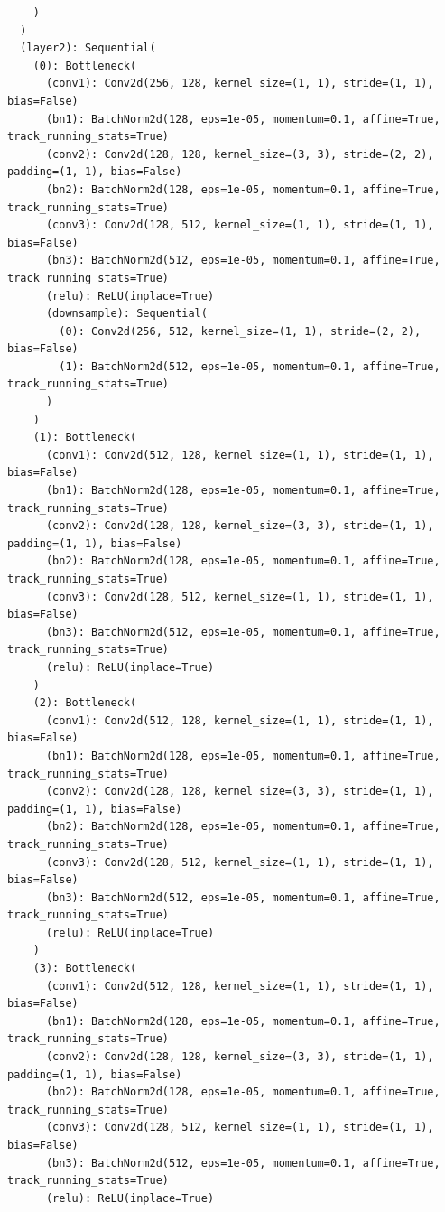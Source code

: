 \documentclass{article}
\begin{document}
\begin{verbatim}
    )
  )
  (layer2): Sequential(
    (0): Bottleneck(
      (conv1): Conv2d(256, 128, kernel_size=(1, 1), stride=(1, 1), bias=False)
      (bn1): BatchNorm2d(128, eps=1e-05, momentum=0.1, affine=True, track_running_stats=True)
      (conv2): Conv2d(128, 128, kernel_size=(3, 3), stride=(2, 2), padding=(1, 1), bias=False)
      (bn2): BatchNorm2d(128, eps=1e-05, momentum=0.1, affine=True, track_running_stats=True)
      (conv3): Conv2d(128, 512, kernel_size=(1, 1), stride=(1, 1), bias=False)
      (bn3): BatchNorm2d(512, eps=1e-05, momentum=0.1, affine=True, track_running_stats=True)
      (relu): ReLU(inplace=True)
      (downsample): Sequential(
        (0): Conv2d(256, 512, kernel_size=(1, 1), stride=(2, 2), bias=False)
        (1): BatchNorm2d(512, eps=1e-05, momentum=0.1, affine=True, track_running_stats=True)
      )
    )
    (1): Bottleneck(
      (conv1): Conv2d(512, 128, kernel_size=(1, 1), stride=(1, 1), bias=False)
      (bn1): BatchNorm2d(128, eps=1e-05, momentum=0.1, affine=True, track_running_stats=True)
      (conv2): Conv2d(128, 128, kernel_size=(3, 3), stride=(1, 1), padding=(1, 1), bias=False)
      (bn2): BatchNorm2d(128, eps=1e-05, momentum=0.1, affine=True, track_running_stats=True)
      (conv3): Conv2d(128, 512, kernel_size=(1, 1), stride=(1, 1), bias=False)
      (bn3): BatchNorm2d(512, eps=1e-05, momentum=0.1, affine=True, track_running_stats=True)
      (relu): ReLU(inplace=True)
    )
    (2): Bottleneck(
      (conv1): Conv2d(512, 128, kernel_size=(1, 1), stride=(1, 1), bias=False)
      (bn1): BatchNorm2d(128, eps=1e-05, momentum=0.1, affine=True, track_running_stats=True)
      (conv2): Conv2d(128, 128, kernel_size=(3, 3), stride=(1, 1), padding=(1, 1), bias=False)
      (bn2): BatchNorm2d(128, eps=1e-05, momentum=0.1, affine=True, track_running_stats=True)
      (conv3): Conv2d(128, 512, kernel_size=(1, 1), stride=(1, 1), bias=False)
      (bn3): BatchNorm2d(512, eps=1e-05, momentum=0.1, affine=True, track_running_stats=True)
      (relu): ReLU(inplace=True)
    )
    (3): Bottleneck(
      (conv1): Conv2d(512, 128, kernel_size=(1, 1), stride=(1, 1), bias=False)
      (bn1): BatchNorm2d(128, eps=1e-05, momentum=0.1, affine=True, track_running_stats=True)
      (conv2): Conv2d(128, 128, kernel_size=(3, 3), stride=(1, 1), padding=(1, 1), bias=False)
      (bn2): BatchNorm2d(128, eps=1e-05, momentum=0.1, affine=True, track_running_stats=True)
      (conv3): Conv2d(128, 512, kernel_size=(1, 1), stride=(1, 1), bias=False)
      (bn3): BatchNorm2d(512, eps=1e-05, momentum=0.1, affine=True, track_running_stats=True)
      (relu): ReLU(inplace=True)

\end{verbatim}
\end{document}
